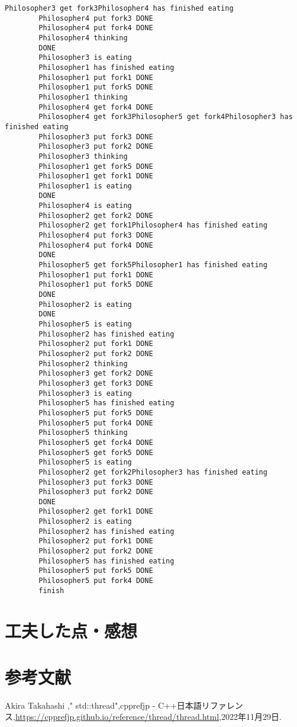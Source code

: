 \documentclass[a4paper,dvipdfmx]{jsarticle}
\begin{document}
\begin{lstlisting}[caption=実行結果,label=run_res]
        Philosopher3 get fork3Philosopher4 has finished eating
        Philosopher4 put fork3 DONE 
        Philosopher4 put fork4 DONE 
        Philosopher4 thinking
        DONE 
        Philosopher3 is eating
        Philosopher1 has finished eating
        Philosopher1 put fork1 DONE 
        Philosopher1 put fork5 DONE 
        Philosopher1 thinking
        Philosopher4 get fork4 DONE 
        Philosopher4 get fork3Philosopher5 get fork4Philosopher3 has finished eating
        Philosopher3 put fork3 DONE 
        Philosopher3 put fork2 DONE 
        Philosopher3 thinking
        Philosopher1 get fork5 DONE 
        Philosopher1 get fork1 DONE 
        Philosopher1 is eating
        DONE 
        Philosopher4 is eating
        Philosopher2 get fork2 DONE 
        Philosopher2 get fork1Philosopher4 has finished eating
        Philosopher4 put fork3 DONE 
        Philosopher4 put fork4 DONE 
        DONE 
        Philosopher5 get fork5Philosopher1 has finished eating
        Philosopher1 put fork1 DONE 
        Philosopher1 put fork5 DONE 
        DONE 
        Philosopher2 is eating
        DONE 
        Philosopher5 is eating
        Philosopher2 has finished eating
        Philosopher2 put fork1 DONE 
        Philosopher2 put fork2 DONE 
        Philosopher2 thinking
        Philosopher3 get fork2 DONE 
        Philosopher3 get fork3 DONE 
        Philosopher3 is eating
        Philosopher5 has finished eating
        Philosopher5 put fork5 DONE 
        Philosopher5 put fork4 DONE 
        Philosopher5 thinking
        Philosopher5 get fork4 DONE 
        Philosopher5 get fork5 DONE 
        Philosopher5 is eating
        Philosopher2 get fork2Philosopher3 has finished eating
        Philosopher3 put fork3 DONE 
        Philosopher3 put fork2 DONE 
        DONE 
        Philosopher2 get fork1 DONE 
        Philosopher2 is eating
        Philosopher2 has finished eating
        Philosopher2 put fork1 DONE 
        Philosopher2 put fork2 DONE 
        Philosopher5 has finished eating
        Philosopher5 put fork5 DONE 
        Philosopher5 put fork4 DONE 
        finish
    \end{lstlisting}

\section{工夫した点・感想}


\section{参考文献}
\begin{thebibliography}{99}
    \item Akira Takahashi ," std::thread",cpprefjp - C++日本語リファレンス,\url{https://cpprefjp.github.io/reference/thread/thread.html},2022年11月29日.

\end{thebibliography}
\end{document}
